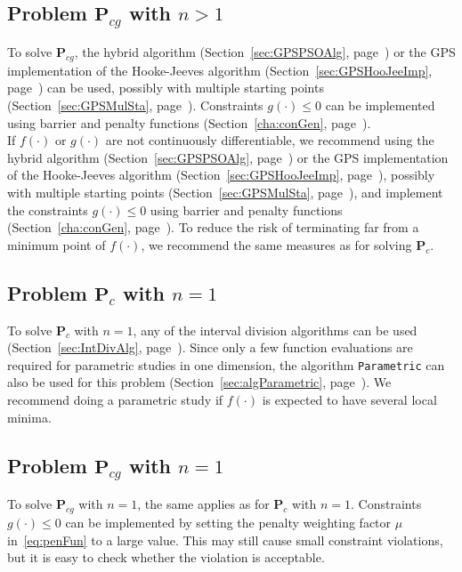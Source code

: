 \subsection{Problem $\mathbf P_{cg}$ with $n>1$}
To solve $\mathbf P_{cg}$, 
the hybrid algorithm (Section~\ref{sec:GPSPSOAlg}, page~\pageref{sec:GPSPSOAlg})
or
the GPS implementation of the Hooke-Jeeves algorithm 
(Section~\ref{sec:GPSHooJeeImp}, page~\pageref{sec:GPSHooJeeImp})
can be used,
possibly with multiple starting points (Section~\ref{sec:GPSMulSta}, page~\pageref{sec:GPSMulSta}).
Constraints $g(\cdot) \le 0$ can be implemented
using barrier and penalty functions
(Section~\ref{cha:conGen}, page~\pageref{cha:conGen}).\\

If $f(\cdot)$ or $g(\cdot)$ are not continuously differentiable,
we recommend using 
the hybrid algorithm (Section~\ref{sec:GPSPSOAlg}, page~\pageref{sec:GPSPSOAlg})
or
the GPS implementation of the Hooke-Jeeves algorithm
(Section~\ref{sec:GPSHooJeeImp}, page~\pageref{sec:GPSHooJeeImp}),
possibly with multiple starting points (Section~\ref{sec:GPSMulSta}, page~\pageref{sec:GPSMulSta}),
and implement the constraints $g(\cdot) \le 0$ 
using barrier and penalty functions
(Section~\ref{cha:conGen}, page~\pageref{cha:conGen}).
To reduce the risk of terminating far from a minimum point of $f(\cdot)$,
we recommend the same measures as for solving $\mathbf P_c$.\\

\subsection{Problem $\mathbf P_{c}$ with $n=1$}
To solve $\mathbf P_c$ with $n=1$, 
any of the interval division algorithms can be used
(Section~\ref{sec:IntDivAlg}, page~\pageref{sec:IntDivAlg}).
Since only a few function evaluations are required for parametric studies
in one dimension, the algorithm \texttt{Parametric} can also be used for this problem
(Section~\ref{sec:algParametric}, page~\pageref{sec:algParametric}).
We recommend doing a parametric study if $f(\cdot)$ is expected to have 
several local minima.

\subsection{Problem $\mathbf P_{cg}$ with $n=1$}
To solve $\mathbf P_{cg}$ with $n=1$, 
the same applies as for $\mathbf P_{c}$ with $n=1$.
Constraints $g(\cdot) \le 0$ can be implemented by setting 
the penalty weighting factor $\mu$ in~\eqref{eq:penFun} to a large value.
This may still cause small constraint violations, 
but it is easy to check whether the violation is acceptable.

